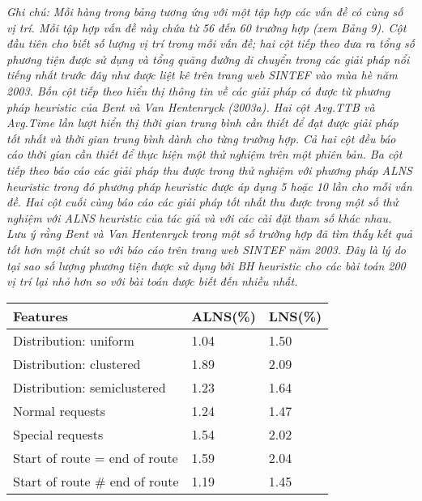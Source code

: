 \begin{table}[caption={Comparison Between ALNS Heuristic and Existing Heuristics}, label=tab:2]
        \justify
        \textit{Ghi chú: Mỗi hàng trong bảng tương ứng với một tập hợp các vấn đề có cùng số vị trí. Mỗi tập hợp vấn đề này chứa từ 56 đến 60 trường hợp (xem Bảng 9). Cột đầu tiên cho biết số lượng vị trí trong mỗi vấn đề; hai cột tiếp theo đưa ra tổng số phương tiện được sử dụng và tổng quãng đường di chuyển trong các giải pháp nổi tiếng nhất trước đây như được liệt kê trên trang web SINTEF vào mùa hè năm 2003. Bốn cột tiếp theo hiển thị thông tin về các giải pháp có được từ phương pháp heuristic của Bent và Van Hentenryck (2003a). Hai cột Avg.TTB và Avg.Time lần lượt hiển thị thời gian trung bình cần thiết để đạt được giải pháp tốt nhất và thời gian trung bình dành cho từng trường hợp. Cả hai cột đều báo cáo thời gian cần thiết để thực hiện một thử nghiệm trên một phiên bản. Ba cột tiếp theo báo cáo các giải pháp thu được trong thử nghiệm với phương pháp ALNS heuristic trong đó phương pháp heuristic được áp dụng 5 hoặc 10 lần cho mỗi vấn đề. Hai cột cuối cùng báo cáo các giải pháp tốt nhất thu được trong một số thử nghiệm với ALNS heuristic của tác giả và với các cài đặt tham số khác nhau. Lưu ý rằng Bent và Van Hentenryck trong một số trường hợp đã tìm thấy kết quả tốt hơn một chút so với báo cáo trên trang web SINTEF năm 2003. Đây là lý do tại sao số lượng phương tiện được sử dụng bởi BH heuristic cho các bài toán 200 vị trí lại nhỏ hơn so với bài toán được biết đến nhiều nhất.}
\end{table}


\begin{table}[caption={Summary of the Influence of Certain Problem Features on the Heuristic Solutions}, label=tab:2]
    \begin{tabular}{lll}
        \toprule
        Features& ALNS(\%) & LNS(\%) \\ \midrule
    Distribution: uniform         & 1.04 & 1.50 \\
    Distribution: clustered       & 1.89 & 2.09       \\
    Distribution: semiclustered   & 1.23 & 1.64       \\
    Normal requests               & 1.24 & 1.47       \\
    Special requests              & 1.54 & 2.02       \\
    Start of route = end of route & 1.59 & 2.04       \\
    Start of route \# end of route & 1.19 & 1.45      
    \end{tabular} \\
\end{table}

